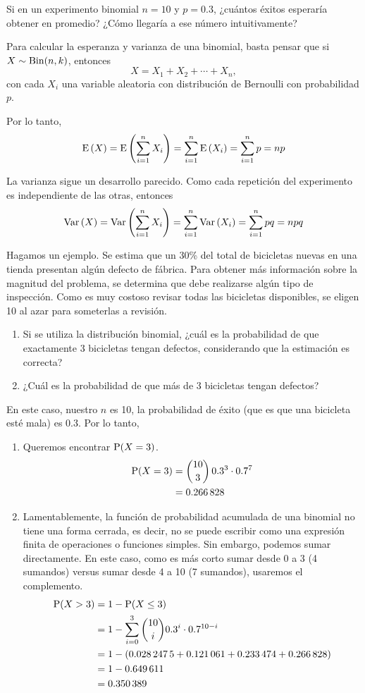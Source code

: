 \begin{pausa}
Si en un experimento binomial \(n = 10\) y \(p = \num{0,3}\), ¿cuántos éxitos esperaría obtener en promedio? ¿Cómo llegaría a ese número intuitivamente?
\end{pausa}

\newpage
Para calcular la esperanza y varianza de una binomial, basta pensar que si \(X \sim \operatorname{Bin}(n, k)\), entonces \[X = X_1 + X_2 + \cdots + X_n,\] con cada \(X_i\) una variable aleatoria con distribución de Bernoulli con probabilidad \(p\).

Por lo tanto, \[\operatorname{E}\left(X\right) = \operatorname{E}\left(\sum_{i=1}^{n}X_i\right) = \sum_{i=1}^{n}\operatorname{E}\left(X_i\right)= \sum_{i=1}^{n}p = np\]

La varianza sigue un desarrollo parecido. Como cada repetición del experimento es independiente de las otras, entonces \[\operatorname{Var}\left(X\right)=\operatorname{Var}\left(\sum_{i=1}^{n}X_i\right) = \sum_{i=1}^{n}\operatorname{Var}\left(X_i\right) = \sum_{i=1}^{n}pq = npq\]

Hagamos un ejemplo. Se estima que un 30\% del total de bicicletas nuevas en una tienda presentan algún defecto de fábrica. 
Para obtener más información sobre la magnitud del problema, se determina que debe realizarse algún tipo de inspección. 
Como es muy costoso revisar todas las bicicletas disponibles, se eligen 10 al azar para someterlas a revisión.

\begin{enumerate}
    \item Si se utiliza la distribución binomial, ¿cuál es la probabilidad de que exactamente 3 bicicletas tengan defectos, considerando que la estimación es correcta?
    \item ¿Cuál es la probabilidad de que más de 3 bicicletas tengan defectos?
\end{enumerate}

En este caso, nuestro \(n\) es 10, la probabilidad de éxito (que es que una bicicleta esté mala) es \num{0,3}. Por lo tanto, 
\begin{enumerate}
    \item Queremos encontrar \(\operatorname{P}(X=3)\).
\begin{align*}
\operatorname{P}(X=3) &= \binom{10}{3}\,\num{0,3}^3\cdot\num{0,7}^7\\
&= \num{0.266828}
\end{align*}

\item Lamentablemente, la función de probabilidad acumulada de una binomial no tiene una forma cerrada, es decir, no se puede escribir como una expresión finita de operaciones o funciones simples. Sin embargo, podemos sumar directamente. En este caso, como es más corto sumar desde 0 a 3 (4 sumandos) versus sumar desde 4 a 10 (7 sumandos), usaremos el complemento.
\begin{align*}
    \operatorname{P}(X>3) &= 1-\operatorname{P}(X\leq3)\\
    &= 1-\sum_{i=0}^{3}\binom{10}{i} \num{0,3}^i\cdot\num{0,7}^{10-i}\\
    &= 1-(\num{0.0282475} + \num{0.121061} + \num{0.233474} + \num{0.266828})\\
    &= 1- \num{0.649611}\\
    &= \num{0.350389}
\end{align*}
\end{enumerate}

